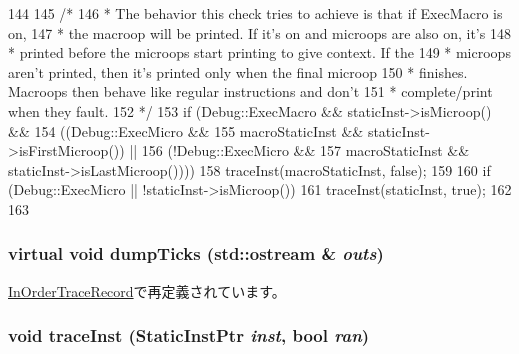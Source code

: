 \begin{DoxyCode}
144 {
145     /*
146      * The behavior this check tries to achieve is that if ExecMacro is on,
147      * the macroop will be printed. If it's on and microops are also on, it's
148      * printed before the microops start printing to give context. If the
149      * microops aren't printed, then it's printed only when the final microop
150      * finishes. Macroops then behave like regular instructions and don't
151      * complete/print when they fault.
152      */
153     if (Debug::ExecMacro && staticInst->isMicroop() &&
154         ((Debug::ExecMicro &&
155             macroStaticInst && staticInst->isFirstMicroop()) ||
156             (!Debug::ExecMicro &&
157              macroStaticInst && staticInst->isLastMicroop()))) {
158         traceInst(macroStaticInst, false);
159     }
160     if (Debug::ExecMicro || !staticInst->isMicroop()) {
161         traceInst(staticInst, true);
162     }
163 }
\end{DoxyCode}
\hypertarget{classTrace_1_1ExeTracerRecord_aef89645ab69fe4a5a6d76dd3439ad417}{
\subsubsection[{dumpTicks}]{\setlength{\rightskip}{0pt plus 5cm}virtual void dumpTicks (std::ostream \& {\em outs})}}
\label{classTrace_1_1ExeTracerRecord_aef89645ab69fe4a5a6d76dd3439ad417}


\hyperlink{classTrace_1_1InOrderTraceRecord_afadde33f39e50889354f68ca4296a2ff}{InOrderTraceRecord}で再定義されています。\hypertarget{classTrace_1_1ExeTracerRecord_a82b1db57da6b03b92f9e8836e93256ef}{
\subsubsection[{traceInst}]{\setlength{\rightskip}{0pt plus 5cm}void traceInst ({\bf StaticInstPtr} {\em inst}, \/  bool {\em ran})}}
\label{classTrace_1_1ExeTracerRecord_a82b1db57da6b03b92f9e8836e93256ef}



